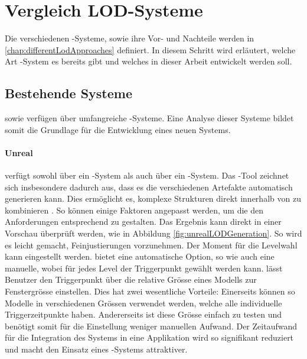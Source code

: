 \section{Vergleich LOD-Systeme}
Die verschiedenen -Systeme, sowie ihre Vor- und Nachteile werden in \autoref{chap:differentLodApproaches} definiert. In diesem Schritt wird erläutert, welche Art -System es bereits gibt und welches in dieser Arbeit entwickelt werden soll.

\subsection{Bestehende Systeme}
\label{chap:existingSolutions}

 sowie  verfügen über umfangreiche -Systeme. Eine Analyse dieser Systeme bildet somit die Grundlage für die Entwicklung eines neuen Systems.

\paragraph{Unreal}

 verfügt sowohl über ein -System als auch über ein -System. Das -Tool zeichnet sich insbesondere dadurch aus, dass es die verschiedenen Artefakte automatisch generieren kann. Dies ermöglicht es, komplexe Strukturen direkt innerhalb von  zu kombinieren \cite{unrealProxyLod}.
So können einige Faktoren angepasst werden, um die  den Anforderungen entsprechend zu gestalten. Das Ergebnis kann direkt in einer Vorschau überprüft werden, wie in Abbildung \ref{fig:unrealLODGeneration}. So wird es leicht gemacht, Feinjustierungen vorzunehmen.
Der Moment für die Levelwahl kann eingestellt werden.  bietet eine automatische Option, so wie auch eine manuelle, wobei für jedes Level der Triggerpunkt gewählt werden kann.
 lässt Benutzer den Triggerpunkt über die relative Grösse eines Modells zur Fenstergrösse einstellen. Dies hat zwei wesentliche Vorteile: Einerseits können so Modelle in verschiedenen Grössen verwendet werden, welche alle individuelle Triggerzeitpunkte haben. Andererseits ist diese Grösse einfach zu testen und benötigt somit für die Einstellung weniger manuellen Aufwand.
Der Zeitaufwand für die Integration des Systems in eine Applikation wird so signifikant reduziert und macht den Einsatz eines -Systems attraktiver.

